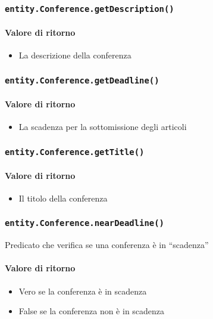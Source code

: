 \subsubsection{\texttt{entity.Conference.getDescription()}}
\paragraph{Valore di ritorno}
\begin{itemize}
\item La descrizione della conferenza
\end{itemize}
\subsubsection{\texttt{entity.Conference.getDeadline()}}
\paragraph{Valore di ritorno}
\begin{itemize}
\item La scadenza per la sottomissione degli articoli
\end{itemize}
\subsubsection{\texttt{entity.Conference.getTitle()}}
\paragraph{Valore di ritorno}
\begin{itemize}
\item Il titolo della conferenza
\end{itemize}
\subsubsection{\texttt{entity.Conference.nearDeadline()}}
Predicato che verifica se una conferenza è in ``scadenza''
\paragraph{Valore di ritorno}
\begin{itemize}
\item Vero se la conferenza è in scadenza
\item False se la conferenza non  è in scadenza
\end{itemize}

